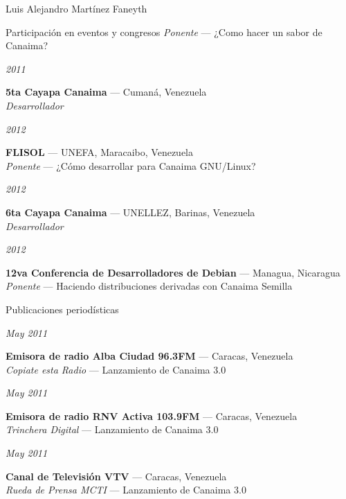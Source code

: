 \documentclass[11pt,letterpaper]{article}
\begin{document}
\begin{cv}{Luis Alejandro Mart\'inez Faneyth}
\begin{cvlist}{Participaci\'on en eventos y congresos}
{{		\textit{Ponente} --- ¿Como hacer un sabor de Canaima?
	}
}
\item[{\parbox[t]{6em}{\textit{\large{2011}}}}]{
	\parbox[t]{\linewidth}{
		\textbf{5ta Cayapa Canaima} --- Cuman\'a, Venezuela\\
		\textit{Desarrollador}
	}
}
\item[{\parbox[t]{6em}{\textit{\large{2012}}}}]{
	\parbox[t]{\linewidth}{
		\textbf{FLISOL} --- UNEFA, Maracaibo, Venezuela\\
		\textit{Ponente} --- ¿C\'omo desarrollar para Canaima GNU/Linux?
	}
}
\item[{\parbox[t]{6em}{\textit{\large{2012}}}}]{
	\parbox[t]{\linewidth}{
		\textbf{6ta Cayapa Canaima} --- UNELLEZ, Barinas, Venezuela\\
		\textit{Desarrollador}
	}
}
\item[{\parbox[t]{6em}{\textit{\large{2012}}}}]{
	\parbox[t]{\linewidth}{
		\textbf{12va Conferencia de Desarrolladores de Debian} --- Managua, Nicaragua\\
		\textit{Ponente} --- Haciendo distribuciones derivadas con Canaima Semilla
	}
}
\end{cvlist}

\begin{cvlist}{Publicaciones period\'isticas}
\item[{\parbox[t]{6em}{\textit{\large{May 2011}}}}]{
	\parbox[t]{\linewidth}{
		\textbf{Emisora de radio Alba Ciudad 96.3FM} --- Caracas, Venezuela\\
		\textit{Copiate esta Radio} --- Lanzamiento de Canaima 3.0
	}
}
\item[{\parbox[t]{6em}{\textit{\large{May 2011}}}}]{
	\parbox[t]{\linewidth}{
		\textbf{Emisora de radio RNV Activa 103.9FM} --- Caracas, Venezuela\\
		\textit{Trinchera Digital} --- Lanzamiento de Canaima 3.0
	}
}
\item[{\parbox[t]{6em}{\textit{\large{May 2011}}}}]{
	\parbox[t]{\linewidth}{
		\textbf{Canal de Televisi\'on VTV} --- Caracas, Venezuela\\
		\textit{Rueda de Prensa MCTI} --- Lanzamiento de Canaima 3.0
	}
}
\end{cvlist}


\end{cv}
\end{document}
